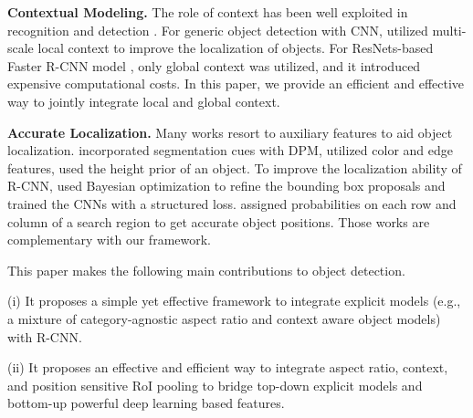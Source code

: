 \documentclass[10pt,twocolumn,letterpaper]{article}
\begin{document}
\textbf{Contextual Modeling.}
The role of context has been well exploited in recognition and detection \cite{desai, carAOG, guangchen_cvpr, hoiem06, torralba, haoxiang, laptev15}. For generic object detection with CNN,
\cite{mrcnn, multipath} utilized multi-scale local context to improve the localization of objects.
For ResNets-based Faster R-CNN model \cite{resNet}, only global context was utilized, and it introduced expensive computational costs. In this paper, we provide an efficient and effective way to jointly integrate local and global context.

\textbf{Accurate Localization.}
Many works resort to auxiliary features to aid object localization. \cite{fidler} incorporated segmentation cues with DPM, \cite{hoiem_loc} utilized color and edge features, \cite{Schulter_2014_CVPR} used the height prior of an object. To improve the localization ability of R-CNN,
\cite{yuting} used Bayesian optimization to refine the bounding box proposals and trained the CNNs with a structured loss. \cite{locNet} assigned probabilities on each row and column of a search region to get accurate object positions. Those works are complementary with our framework.


This paper makes the following main contributions to object detection. 

\iffalse{
For simplicity, we model objects with different shapes by aspect ratios as similar to \cite{DPM}. Our method effectively relieved the warping artifacts in R-CNN style models. 
In this paper, our goal is to integrating aspect ratios and context in the region-based model, boosting the performance while not increasing the computation burden much. 
We will investigate an effective and efficient way to integrate both local and global context.
}\fi

(i) It proposes a simple yet effective framework to integrate explicit models (e.g., a mixture of category-agnostic aspect ratio and context aware object models) with R-CNN.

(ii) It proposes an effective and efficient way to integrate aspect ratio, context, and position sensitive RoI pooling to bridge top-down explicit models and bottom-up powerful deep learning based features.
\end{document}
